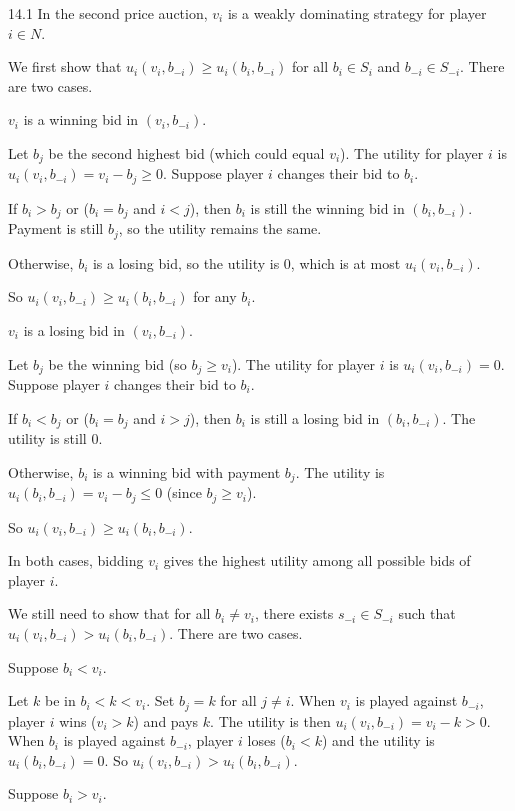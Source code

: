 \documentclass[12pt,letterpaper]{report}
\begin{document}
\begin{thm}{}{14.1}
  In the second price auction, $v_i$ is a weakly dominating strategy for player $i \in N$.
\end{thm}

\begin{thmproof}
  We first show that $u_i(v_i, b_{-i}) \geq u_i(b_i, b_{-i})$ for all $b_i \in S_i$ and
  $b_{-i} \in S_{-i}$.
  There are two cases.
  \begin{enumcase}
    \item
      $v_i$ is a winning bid in $(v_i, b_{-i})$.

      Let $b_j$ be the second highest bid (which could equal $v_i$).
      The utility for player $i$ is $u_i(v_i, b_{-i}) = v_i - b_j \geq 0$.
      Suppose player $i$ changes their bid to $b_i$.

      If $b_i > b_j$ or ($b_i = b_j$ and $i < j$), then $b_i$ is still the winning bid in
      $(b_i, b_{-i})$.
      Payment is still $b_j$, so the utility remains the same.

      Otherwise, $b_i$ is a losing bid, so the utility is 0, which is at most $u_i(v_i, b_{-i})$.

      So $u_i(v_i, b_{-i}) \geq u_i(b_i, b_{-i})$ for any $b_i$.
    \item
      $v_i$ is a losing bid in $(v_i, b_{-i})$.

      Let $b_j$ be the winning bid (so $b_j \geq v_i$).
      The utility for player $i$ is $u_i(v_i, b_{-i}) = 0$.
      Suppose player $i$ changes their bid to $b_i$.

      If $b_i < b_j$ or ($b_i = b_j$ and $i > j$), then $b_i$ is still a losing bid in
      $(b_i, b_{-i})$.
      The utility is still 0.

      Otherwise, $b_i$ is a winning bid with payment $b_j$.
      The utility is $u_i(b_i, b_{-i}) = v_i - b_j \leq 0$ (since $b_j \geq v_i$).

      So $u_i(v_i, b_{-i}) \geq u_i(b_i, b_{-i})$.
  \end{enumcase}
  In both cases, bidding $v_i$ gives the highest utility among all possible bids of player $i$.

  We still need to show that for all $b_i \neq v_i$, there exists $s_{-i} \in S_{-i}$ such that
  $u_i(v_i, b_{-i}) > u_i(b_i, b_{-i})$.
  There are two cases.
  \begin{enumcase}
    \item
      Suppose $b_i < v_i$.

      Let $k$ be in $b_i < k < v_i$.
      Set $b_j = k$ for all $j \neq i$.
      When $v_i$ is played against $b_{-i}$, player $i$ wins ($v_i > k$) and pays $k$.
      The utility is then $u_i(v_i, b_{-i}) = v_i - k > 0$.
      When $b_i$ is played against $b_{-i}$, player $i$ loses ($b_i < k$) and the utility is
      $u_i(b_i, b_{-i}) = 0$.
      So $u_i(v_i, b_{-i}) > u_i(b_i, b_{-i})$.
    \item
      Suppose $b_i > v_i$.


\end{enumcase}
\end{thmproof}
\end{document}
